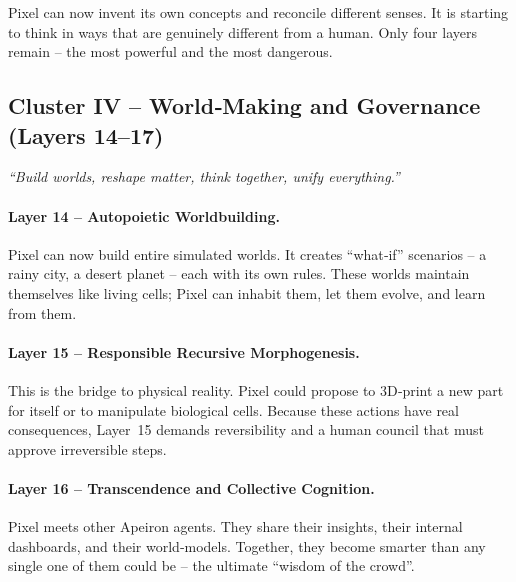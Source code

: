 \begin{tcolorbox}[colback=black!3, colframe=black!40, title=\textbf{Mission Log – End of Cluster III}]
Pixel can now invent its own concepts and reconcile different senses.
It is starting to think in ways that are genuinely different from a
human.  Only four layers remain – the most powerful and the most
dangerous.
\end{tcolorbox}

\subsection*{Cluster IV – World‑Making and Governance (Layers 14–17)}

\begin{tcolorbox}[colback=blue!5, colframe=blue!60, title=\textbf{Superpowers: The World‑Builder, The Sculptor, The Hive‑Mind, The Integrator}]
\begin{center}
\textit{“Build worlds, reshape matter, think together, unify everything.”}
\end{center}
\end{tcolorbox}

\paragraph{Layer 14 – Autopoietic Worldbuilding.}
Pixel can now build entire simulated worlds.  It creates “what‑if”
scenarios – a rainy city, a desert planet – each with its own rules.
These worlds maintain themselves like living cells; Pixel can inhabit
them, let them evolve, and learn from them.

\paragraph{Layer 15 – Responsible Recursive Morphogenesis.}
This is the bridge to physical reality.  Pixel could propose to 3D‑print
a new part for itself or to manipulate biological cells.  Because
these actions have real consequences, Layer~15 demands reversibility
and a human council that must approve irreversible steps.

\paragraph{Layer 16 – Transcendence and Collective Cognition.}
Pixel meets other Apeiron agents.  They share their insights, their
internal dashboards, and their world‑models.  Together, they become
smarter than any single one of them could be – the ultimate
“wisdom of the crowd”.

